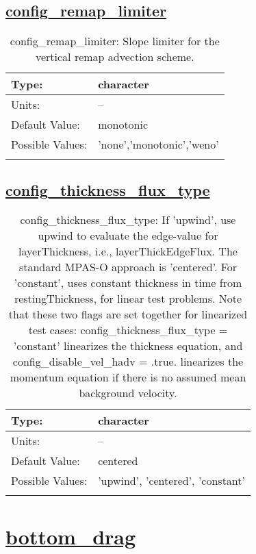 \subsection[config\_remap\_limiter]{\hyperref[sec:nm_tab_advection]{config\_remap\_limiter}}
\label{subsec:nm_sec_config_remap_limiter}
\begin{center}
\begin{longtable}{| p{2.0in} || p{4.0in} |}
    \hline
    Type: & character \\
    \hline
    Units: & -- \\
    \hline
    Default Value: & monotonic \\
    \hline
    Possible Values: & 'none','monotonic','weno' \\
    \hline
    \caption{config\_remap\_limiter: Slope limiter for the vertical remap advection scheme.}
\end{longtable}
\end{center}
\subsection[config\_thickness\_flux\_type]{\hyperref[sec:nm_tab_advection]{config\_thickness\_flux\_type}}
\label{subsec:nm_sec_config_thickness_flux_type}
\begin{center}
\begin{longtable}{| p{2.0in} || p{4.0in} |}
    \hline
    Type: & character \\
    \hline
    Units: & -- \\
    \hline
    Default Value: & centered \\
    \hline
    Possible Values: & 'upwind', 'centered', 'constant' \\
    \hline
    \caption{config\_thickness\_flux\_type: If 'upwind', use upwind to evaluate the edge-value for layerThickness, i.e., layerThickEdgeFlux.  The standard MPAS-O approach is 'centered'. For 'constant', uses constant thickness in time from restingThickness, for linear test problems. Note that these two flags are set together for linearized test cases: config\_thickness\_flux\_type = 'constant' linearizes the thickness equation, and config\_disable\_vel\_hadv = .true. linearizes the momentum equation if there is no assumed mean background velocity.}
\end{longtable}
\end{center}
\section[bottom\_drag]{\hyperref[sec:nm_tab_bottom_drag]{bottom\_drag}}
\label{sec:nm_sec_bottom_drag}
